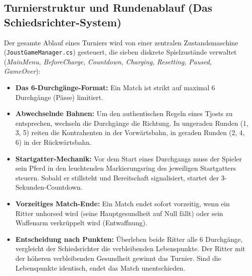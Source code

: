\documentclass[11pt, a4paper]{article}
\begin{document}
\subsection{Turnierstruktur und Rundenablauf (Das Schiedsrichter-System)}
Der gesamte Ablauf eines Turniers wird von einer zentralen Zustandsmaschine (\texttt{JoustGameManager.cs}) gesteuert, die sieben diskrete Spielzustände verwaltet (\textit{MainMenu, BeforeCharge, Countdown, Charging, Resetting, Paused, GameOver}):
\begin{itemize}
    \item \textbf{Das 6-Durchgänge-Format:} Ein Match ist strikt auf maximal 6 Durchgänge (Pässe) limitiert.
    \item \textbf{Abwechselnde Bahnen:} Um den authentischen Regeln eines Tjosts zu entsprechen, wechseln die Durchgänge die Richtung. In ungeraden Runden (1, 3, 5) reiten die Kontrahenten in der Vorwärtsbahn, in geraden Runden (2, 4, 6) in der Rückwärtsbahn.
    \item \textbf{Startgatter-Mechanik:} Vor dem Start eines Durchgangs muss der Spieler sein Pferd in den leuchtenden Markierungsring des jeweiligen Startgatters steuern. Sobald er stillsteht und Bereitschaft signalisiert, startet der 3-Sekunden-Countdown.
    \item \textbf{Vorzeitiges Match-Ende:} Ein Match endet sofort vorzeitig, wenn ein Ritter unhorsed wird (seine Hauptgesundheit auf Null fällt) oder sein Waffenarm verkrüppelt wird (Entwaffnung).
    \item \textbf{Entscheidung nach Punkten:} Überleben beide Ritter alle 6 Durchgänge, vergleicht der Schiedsrichter die verbleibenden Lebenspunkte. Der Ritter mit der höheren verbleibenden Gesundheit gewinnt das Turnier. Sind die Lebenspunkte identisch, endet das Match unentschieden.
\end{itemize}
\end{document}
